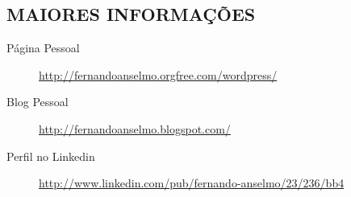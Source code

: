 \documentclass{res}
\begin{document}
\begin{resume}
\section{MAIORES INFORMAÇÕES}
\vspace{18pt} 
\begin{description}
 \item[Página Pessoal] \url{http://fernandoanselmo.orgfree.com/wordpress/}
 \item[Blog Pessoal] \url{http://fernandoanselmo.blogspot.com/}
 \item[Perfil no Linkedin] \url{http://www.linkedin.com/pub/fernando-anselmo/23/236/bb4}
\end{description}

\end{resume} 
\end{document}

